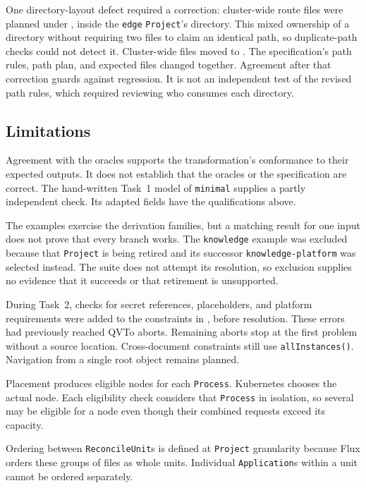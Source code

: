 One directory-layout defect required a correction: cluster-wide route files
were planned under , inside the \texttt{edge}
\texttt{Project}'s directory. This mixed ownership of a directory without
requiring two files to claim an identical path, so duplicate-path checks
could not detect it. Cluster-wide files moved to . The
specification's path rules, path plan, and expected files changed together.
Agreement after that correction guards against regression. It is not an
independent test of the revised path rules, which required reviewing who
consumes each directory.

\subsection{Limitations}
\label{sec:limitations}

Agreement with the oracles supports the transformation's conformance to
their expected outputs. It does not establish that the oracles or the
specification are correct. The hand-written Task~1 model of \texttt{minimal}
supplies a partly independent check. Its adapted fields have the
qualifications above.

The examples exercise the derivation families, but a matching result
for one input does not prove that every branch works. The
\texttt{knowledge} example was excluded because that \texttt{Project} is
being retired and its successor \texttt{knowledge-platform} was selected
instead. The suite does not attempt its resolution, so exclusion supplies
no evidence that it succeeds or that retirement is unsupported.

During Task~2, checks for secret references, placeholders, and platform
requirements were added to the constraints in , before resolution.
These errors had previously reached QVTo aborts. Remaining aborts stop at
the first problem without a source location. Cross-document constraints
still use \texttt{allInstances()}. Navigation from a single root object
remains planned.

Placement produces eligible nodes for each \texttt{Process}. Kubernetes
chooses the actual node. Each eligibility check considers that
\texttt{Process} in isolation, so several may be eligible for a node even
though their combined requests exceed its capacity.

Ordering between \texttt{ReconcileUnit}s is defined at \texttt{Project}
granularity because Flux orders these groups of files as whole units.
Individual \texttt{Application}s within a unit cannot be ordered separately.

